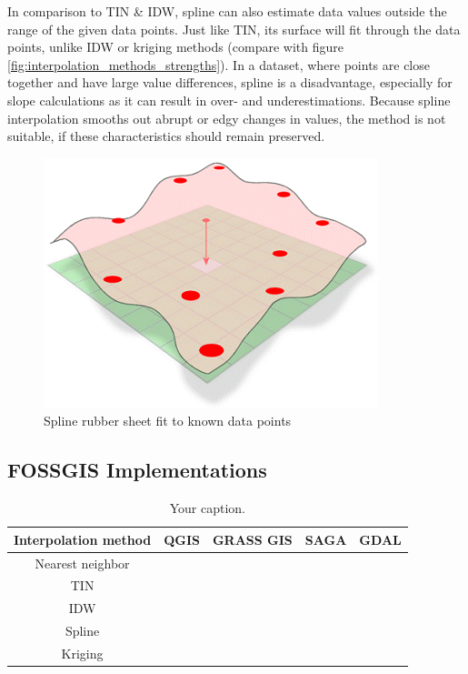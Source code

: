 In comparison to TIN \& IDW, spline can also estimate data values outside the range of the given data points. Just like TIN, its surface will fit through the data points, unlike IDW or kriging methods (compare with figure \ref{fig:interpolation_methods_strengths}). In a dataset, where points are close together and have large value differences, spline is a disadvantage, especially for slope calculations as it can result in over- and underestimations. \cite{wasser_going_2020} Because spline interpolation smooths out abrupt or \ldq{}edgy\rdq{} changes in values, the method is not suitable, if these characteristics should remain preserved.

\begin{figure}
	\centering
	\includegraphics[width=.5\linewidth]{images/spline.png}
	\caption{Spline \ldq{}rubber sheet\rdq{} fit to known data points \cite{albrecht_spline_2005}}
	\label{fig:spline}
\end{figure}


\subsection{FOSSGIS Implementations}

\begin{table}[b!]
	\centering
	\begin{tabular}{c|c|c|c|c}
		Interpolation method & QGIS & GRASS GIS & SAGA & GDAL\\
		\hline
		Nearest neighbor & \xmark &\cmark &\cmark & \cmark \\
		\hline
		TIN & \cmark &\cmark &\cmark & \cmark \\
		\hline
		IDW & \cmark &\cmark &\cmark & \cmark \\
		\hline
		Spline & \xmark &\cmark &\cmark & \xmark \\
		\hline
		Kriging & \xmark &\cmark &\cmark & \xmark \\
	\end{tabular}
	\caption{\label{tab:table-name}Your caption.}
\end{table}







